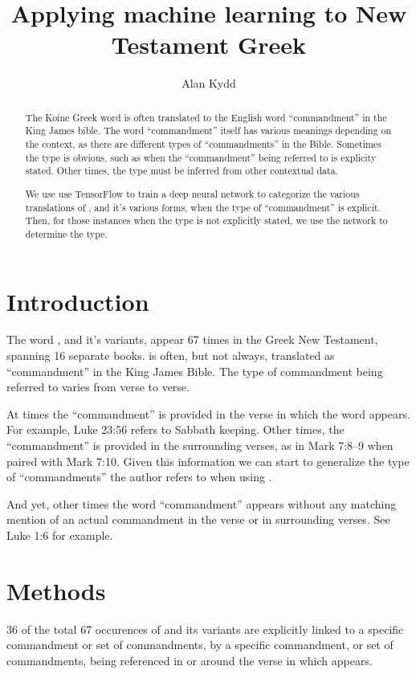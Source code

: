 \documentclass{article}
\title{Applying machine learning to New Testament Greek}
\author{Alan Kydd}
\newcommand{\entole}{\textepsilon\textnu\texttau\textomikron\textlambda\textepsilon\xspace}
\begin{document}
\maketitle

\begin{abstract}
The Koine Greek word \entole is often translated to the English
word ``commandment'' in the King James bible.  The word ``commandment'' itself
has various meanings depending on the context, as there are different types of
``commandments'' in the Bible.  Sometimes the type
is obvious, such as when the ``commandment'' being referred to is explicity
stated.  Other times, the type must be inferred from other contextual
data.

We use use TensorFlow to train a deep neural
network to categorize the various translations of \entole,
and it's various forms, when the type of ``commandment'' is explicit. 
Then, for those instances when the type is not explicitly stated,  we use the network 
to determine the type.
\end{abstract}

\section{Introduction}
The word \entole, and it's variants, appear 67 times in the Greek New 
Testament, spanning 16 separate books.  \entole is often, but not always,
translated as ``commandment'' in the King James Bible.  The type of
commandment being  referred to varies from verse to verse.

At times the ``commandment'' is provided in the verse in which
the word appears.  For example, Luke 23:56 refers to Sabbath keeping.
Other times, the ``commandment'' is provided in the surrounding verses,
as in Mark 7:8--9 when paired with Mark 7:10.  Given this information we can
start to generalize the type of ``commandments'' the author refers to when
using \entole.

And yet, other times the word ``commandment'' appears without any matching
mention of an actual commandment in the verse or in surrounding verses.
See Luke 1:6 for example.

\section{Methods}
36 of the total 67 occurences of \entole and its variants are
explicitly linked to a specific commandment or set of commandments, by
a specific commandment, or set of commandments, being referenced in or around
the verse in which \entole appears.
\end{document}
